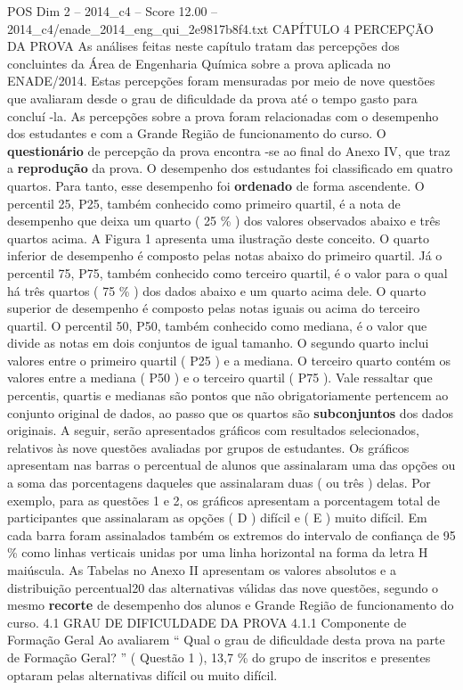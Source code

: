 \begin{textsample}{POS Dim 2 – 2014\_c4 – Score 12.00 – 2014\_c4/enade\_2014\_eng\_qui\_2e9817b8f4.txt}  \label{ex:f2_pos_111}
CAPÍTULO 4 PERCEPÇÃO DA PROVA As análises feitas neste capítulo tratam das percepções dos concluintes da Área de Engenharia Química sobre a prova aplicada no ENADE/2014.
Estas percepções foram mensuradas por meio de nove questões que avaliaram desde o grau de dificuldade da prova até o tempo gasto para concluí -la.
As percepções sobre a prova foram relacionadas com o desempenho dos estudantes e com a Grande Região de funcionamento do curso.
O \textbf{questionário} de percepção da prova encontra -se ao final do Anexo IV, que traz a \textbf{reprodução} da prova.
O desempenho dos estudantes foi classificado em quatro quartos.
Para tanto, esse desempenho foi \textbf{ordenado} de forma ascendente.
O percentil 25, P25, também conhecido como primeiro quartil, é a nota de desempenho que deixa um quarto ( 25 \% ) dos valores observados abaixo e três quartos acima.
A Figura 1 apresenta uma ilustração deste conceito.
O quarto inferior de desempenho é composto pelas notas abaixo do primeiro quartil.
Já o percentil 75, P75, também conhecido como terceiro quartil, é o valor para o qual há três quartos ( 75 \% ) dos dados abaixo e um quarto acima dele.
O quarto superior de desempenho é composto pelas notas iguais ou acima do terceiro quartil.
O percentil 50, P50, também conhecido como mediana, é o valor que divide as notas em dois conjuntos de igual tamanho.
O segundo quarto inclui valores entre o primeiro quartil ( P25 ) e a mediana.
O terceiro quarto contém os valores entre a mediana ( P50 ) e o terceiro quartil ( P75 ).
Vale ressaltar que percentis, quartis e medianas são pontos que não obrigatoriamente pertencem ao conjunto original de dados, ao passo que os quartos são \textbf{subconjuntos} dos dados originais.
A seguir, serão apresentados gráficos com resultados selecionados, relativos às nove questões avaliadas por grupos de estudantes.
Os gráficos apresentam nas barras o percentual de alunos que assinalaram uma das opções ou a soma das porcentagens daqueles que assinalaram duas ( ou três ) delas.
Por exemplo, para as questões 1 e 2, os gráficos apresentam a porcentagem total de participantes que assinalaram as opções ( D ) difícil e ( E ) muito difícil.
Em cada barra foram assinalados também os extremos do intervalo de confiança de 95 \% como linhas verticais unidas por uma linha horizontal na forma da letra H maiúscula.
As Tabelas no Anexo II apresentam os valores absolutos e a distribuição percentual20 das alternativas válidas das nove questões, segundo o mesmo \textbf{recorte} de desempenho dos alunos e Grande Região de funcionamento do curso. 4.1 GRAU DE DIFICULDADE DA PROVA 4.1.1 Componente de Formação Geral Ao avaliarem “ Qual o grau de dificuldade desta prova na parte de Formação Geral? ” ( Questão 1 ), 13,7 \% do grupo de inscritos e presentes optaram pelas alternativas difícil ou muito difícil.

\end{textsample}
